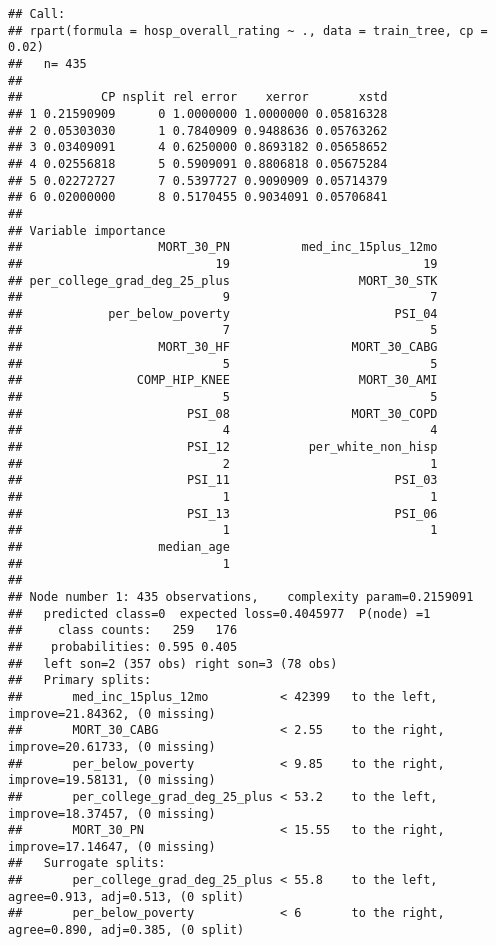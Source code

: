 \documentclass[
]{article}
\begin{document}
\begin{verbatim}
## Call:
## rpart(formula = hosp_overall_rating ~ ., data = train_tree, cp = 0.02)
##   n= 435 
## 
##           CP nsplit rel error    xerror       xstd
## 1 0.21590909      0 1.0000000 1.0000000 0.05816328
## 2 0.05303030      1 0.7840909 0.9488636 0.05763262
## 3 0.03409091      4 0.6250000 0.8693182 0.05658652
## 4 0.02556818      5 0.5909091 0.8806818 0.05675284
## 5 0.02272727      7 0.5397727 0.9090909 0.05714379
## 6 0.02000000      8 0.5170455 0.9034091 0.05706841
## 
## Variable importance
##                   MORT_30_PN          med_inc_15plus_12mo 
##                           19                           19 
## per_college_grad_deg_25_plus                  MORT_30_STK 
##                            9                            7 
##            per_below_poverty                       PSI_04 
##                            7                            5 
##                   MORT_30_HF                 MORT_30_CABG 
##                            5                            5 
##                COMP_HIP_KNEE                  MORT_30_AMI 
##                            5                            5 
##                       PSI_08                 MORT_30_COPD 
##                            4                            4 
##                       PSI_12           per_white_non_hisp 
##                            2                            1 
##                       PSI_11                       PSI_03 
##                            1                            1 
##                       PSI_13                       PSI_06 
##                            1                            1 
##                   median_age 
##                            1 
## 
## Node number 1: 435 observations,    complexity param=0.2159091
##   predicted class=0  expected loss=0.4045977  P(node) =1
##     class counts:   259   176
##    probabilities: 0.595 0.405 
##   left son=2 (357 obs) right son=3 (78 obs)
##   Primary splits:
##       med_inc_15plus_12mo          < 42399   to the left,  improve=21.84362, (0 missing)
##       MORT_30_CABG                 < 2.55    to the right, improve=20.61733, (0 missing)
##       per_below_poverty            < 9.85    to the right, improve=19.58131, (0 missing)
##       per_college_grad_deg_25_plus < 53.2    to the left,  improve=18.37457, (0 missing)
##       MORT_30_PN                   < 15.55   to the right, improve=17.14647, (0 missing)
##   Surrogate splits:
##       per_college_grad_deg_25_plus < 55.8    to the left,  agree=0.913, adj=0.513, (0 split)
##       per_below_poverty            < 6       to the right, agree=0.890, adj=0.385, (0 split)

\end{verbatim}
\end{document}
